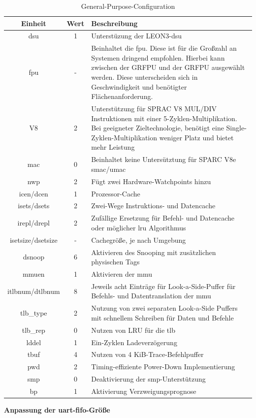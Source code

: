 \begin{table}[H]
 \centering
\begin{tabularx}{\textwidth}{|c|c|X|}
  \hline
  Einheit & Wert & Beschreibung\\
  \hline
  dsu & 1 & Unterstüzung der LEON3-\ac{dsu}\\
  \hline
  fpu & - & Beinhaltet die \ac{fpu}. Diese ist für die Großzahl an Systemen dringend empfohlen.
   Hierbei kann zwischen der GRFPU und der GRFPU ausgewählt werden. Diese unterscheiden sich in Geschwindigkeit und benötigter Flächenanforderung.\\
  \hline
  V8 & 2 & Unterstützung für SPRAC V8 MUL/DIV Instruktionen mit einer 5-Zyklen-Multiplikation. Bei geeigneter Zieltechnologie, benötigt eine Single-Zyklen-Multiplikation weniger Platz und bietet mehr Leistung\\
  \hline
  mac & 0 & Beinhaltet keine Untersütztung für SPARC V8e \ac{smac}/\ac{umac}\\
  \hline
  nwp & 2 & Fügt zwei Hardware-Watchpoints hinzu\\
  \hline
  icen/dcen & 1 & Prozessor-Cache\\
  \hline
  isets/dsets & 2 & Zwei-Wege Instruktions- und Datencache\\
  \hline
  irepl/drepl & 2 & Zufällige Ersetzung für Befehl- und Datencache oder möglicher \ac{lru} Algorithmus\\
  \hline
  isetsize/dsetsize & - & Cachegröße, je nach Umgebung\\
  \hline
  dsnoop & 6 & Aktivieren des Snooping mit zusätzlichen physischen Tags\\
  \hline
  mmuen & 1 & Aktivieren der \ac{mmu}\\
  \hline
  itlbnum/dtlbnum & 8 & Jeweils acht Einträge für Look-a-Side-Puffer für Befehls- und Datentranslation der \ac{mmu}\\
  \hline
  tlb\_type & 2 & Nutzung von zwei separaten Look-a-Side Puffers mit schnellem Schreiben für Daten und Befehle\\
  \hline
  tlb\_rep & 0 & Nutzen von LRU für die \ac{tlb}\\
  \hline
  lddel & 1 & Ein-Zyklen Ladeverzögerung\\
  \hline
  tbuf & 4 & Nutzen von 4 KiB-Trace-Befehlpuffer\\
  \hline
  pwd & 2 & Timing-effiziente Power-Down Implementierung\\
  \hline
  smp & 0 & Deaktivierung der \ac{smp}-Unterstützung\\
  \hline
  bp & 1 & Aktivierung Verzweigungsprognose\\
  \hline
  \end{tabularx}
  \caption{General-Purpose-Configuration}
  \label{tab:generalpurpose}
  \end{table}
\newpage
\textbf{Anpassung der \ac{uart}-\acs{fifo}-Größe}\\

